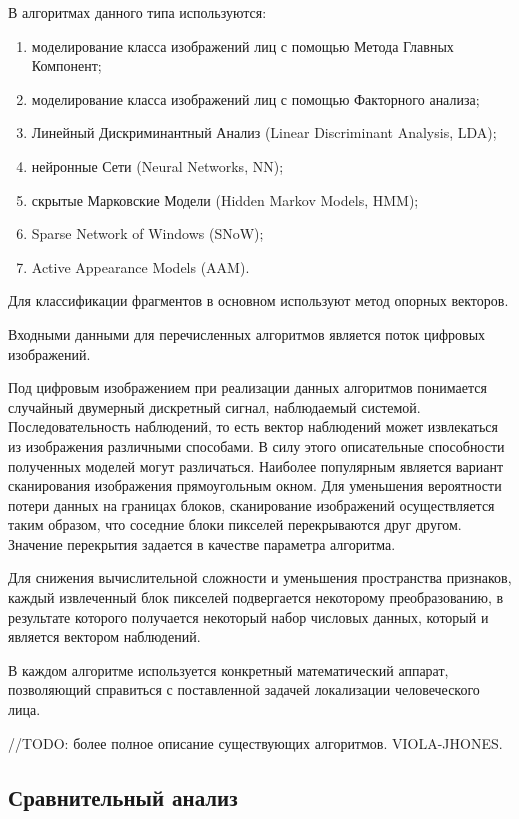 В алгоритмах данного типа используются:
\begin{enumerate}
  \item моделирование класса изображений лиц с помощью Метода Главных Компонент;
  \item моделирование класса изображений лиц с помощью Факторного анализа;
  \item Линейный Дискриминантный Анализ (Linear Discriminant Analysis, LDA);
  \item нейронные Сети (Neural Networks, NN);
  \item скрытые Марковские Модели (Hidden Markov Models, HMM);
  \item Sparse Network of Windows (SNoW);
  \item Active Appearance Models (AAM).
\end{enumerate}

Для классификации фрагментов в основном используют метод опорных векторов.

Входными данными для перечисленных алгоритмов является поток цифровых
изображений.

Под цифровым изображением при реализации данных алгоритмов понимается случайный
двумерный дискретный сигнал, наблюдаемый системой. Последовательность
наблюдений, то есть вектор наблюдений может извлекаться из изображения
различными способами. В силу этого описательные способности полученных моделей
могут различаться. Наиболее популярным является вариант сканирования изображения
прямоугольным окном. Для уменьшения вероятности потери данных на границах
блоков, сканирование изображений осуществляется таким образом, что соседние
блоки пикселей перекрываются друг другом. Значение перекрытия задается в
качестве параметра алгоритма.

Для снижения вычислительной сложности и уменьшения пространства признаков,
каждый извлеченный блок пикселей подвергается некоторому преобразованию, в
результате которого получается некоторый набор числовых данных, который и
является вектором наблюдений.

В каждом алгоритме используется конкретный математический аппарат, позволяющий
справиться с поставленной задачей локализации человеческого лица.

//TODO: более полное описание существующих алгоритмов. VIOLA-JHONES.

\subsection{Сравнительный анализ}

